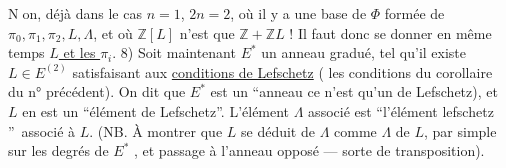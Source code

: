 \textcircled{Non}, déjà dans le cas $n=1$, $2n=2$, où il y a une base de $\Phi$ formée de $\pi_0,\pi_1,\pi_2,L,\Lambda$, et où $\mathbb Z[L]$ n'est que $\mathbb Z+\mathbb Z L$ ! Il faut donc se donner en même temps \uline{$L$ et les $\pi_i$}.
8) Soit maintenant $E^*$ un anneau gradué,  tel qu'il existe $L\in E^{(2)}$ satisfaisant aux \uline{conditions de Lefschetz} ( les conditions du corollaire du n° précédent). On dit que $E^*$ est un \textquotedblleft anneau   ce n'est  qu'un  de Lefschetz), et $L$ en est un \textquotedblleft élément de Lefschetz\textquotedblright.  L'élément $\Lambda$ associé est  \textquotedblleft l'élément   lefschetz \textquotedblright\ associé à $L$. (NB. À montrer que $L$ se déduit de $\Lambda$ comme $\Lambda$ de $L$, par simple  sur les degrés de $E^*$ \deleted{$\unsure{\gtrless}-$}, et passage à l'anneau opposé --- sorte de  transposition).

